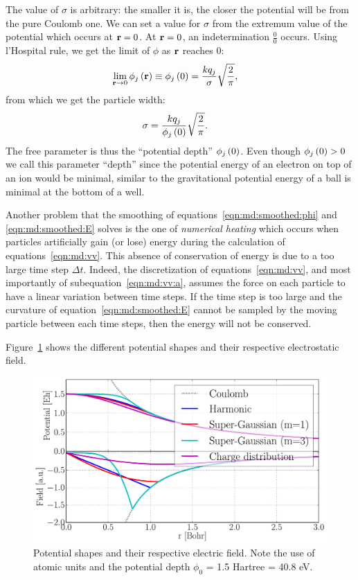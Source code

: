 The value of $\sigma$ is arbitrary: the smaller it is, the closer the potential
will be from the pure Coulomb one. We can set a value for $\sigma$ from the
extremum value of the potential which occurs at $\textbf{r} = 0$. At $\textbf{r} = 0$, an
indetermination $\frac{0}{0}$ occurs. Using l'Hospital rule, we get the limit
of $\phi$ as $\textbf{r}$ reaches 0:
\begin{align}
\lim_{\textbf{r} \rightarrow 0} \phi_j\left( \textbf{r} \right)
    & \equiv \phi_j\left( 0 \right) = \frac{ k q_j }{ \sigma } \sqrt{\frac{2}{\pi}},
\label{eqn:md:smoothed:phi0}
\end{align}
from which we get the particle width:
\begin{align}
\sigma & = \frac{ k q_j }{ \phi_j\left( 0 \right) } \sqrt{ \frac{2}{\pi}}.
\label{eqn:md:sigma}
\end{align}
The free parameter is thus the ``potential depth'' $\phi_j\left( 0 \right)$. Even
though $\phi_j\left( 0 \right) > 0$ we call this parameter ``depth'' since the potential
energy of an electron on top of an ion would be minimal, similar to the
gravitational potential energy of a ball is minimal at the bottom of a well.

Another problem that the smoothing of equations~\eqref{eqn:md:smoothed:phi} and
\eqref{eqn:md:smoothed:E} solves is the one of \textit{numerical heating} which
occurs when particles artificially gain (or lose) energy during the
calculation of equations~\eqref{eqn:md:vv}. This absence of conservation of
energy is due to a too large time step $\Delta t$. Indeed, the
discretization of equations~\eqref{eqn:md:vv}, and most importantly of
subequation~\eqref{eqn:md:vv:a}, assumes the force on each particle to have a
linear variation between time steps. If the time step is too large and the
curvature of equation~\eqref{eqn:md:smoothed:E} cannot be sampled by the moving
particle between each time steps, then the energy will not be conserved.



Figure~\ref{fig:potential:shapes} shows the different potential shapes and their
respective electrostatic field.

\begin{figure}
 \centering
 \includegraphics[width=\figurewidth]{figures/potential_shapes}
 \caption{\label{fig:potential:shapes}Potential shapes and their respective
          electric field. Note the use of atomic units and the potential depth
          $\phi_0$ = 1.5 Hartree = 40.8 eV.}
\end{figure}

